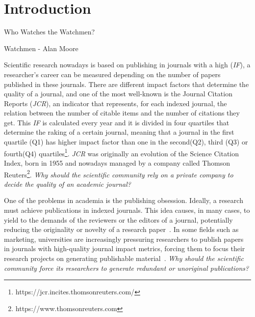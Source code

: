
\chapter{Introduction}
\label{intro}
\begin{FraseCelebre}
  \begin{Frase}
    Who Watches the Watchmen?
  \end{Frase}
  \begin{Fuente}
    Watchmen - Alan Moore
  \end{Fuente}
\end{FraseCelebre}

Scientific research nowadays is based on publishing in journals with a high
 (\emph{IF})\cite{doi:10.1001/jama.295.1.90}, a researcher's
career can be measured depending on the number of papers published in these
journals. There are different impact factors that determine the quality of a
journal, and one of the most well-known is the Journal Citation Reports
(\emph{JCR}), an indicator that represents, for each indexed journal, the
relation between the number of citable items and the number of citations they
get. This \emph{IF} is calculated every year and it is divided in four quartiles
that determine the raking of a certain journal, meaning that a journal in the
first quartile (Q1) has higher impact factor than one in the second(Q2), third
(Q3) or fourth(Q4) quartiles\footnote{https://jcr.incites.thomsonreuters.com/}.
\emph{JCR} was originally an evolution of the Science Citation Index, born in
1955 \cite{garfield2007evolution} and nowadays managed by a company called
Thomson Reuters\footnote{https://www.thomsonreuters.com}. \emph{Why should the
  scientific community rely on a private company to decide the quality of an
  academic journal?}

One of the problems in academia is the publishing obsession. Ideally, a research
must achieve publications in indexed journals. This idea causes, in many cases,
to yield to the demands of the reviewers or the editors of a journal,
potentially reducing the originality or novelty of a research
paper~\cite{Frey2003}. In some fields such as marketing, universities are
increasingly pressuring researchers to publish papers in journals with
high-quality journal impact metrics, forcing them to focus their research
projects on generating publishable material~\cite{ortinau2011writing}. \emph{Why
  should the scientific community force its researchers to generate redundant or
  unoriginal publications?}


